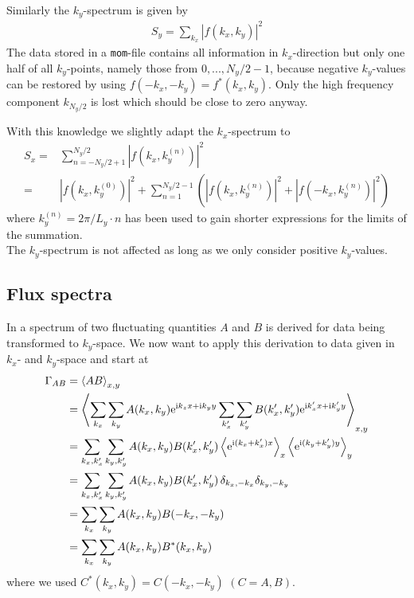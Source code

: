 \documentclass[12pt, a4paper, fleqn]{article}
\begin{document}
Similarly the $k_y$-spectrum is given by
\begin{align}
S_y = \sum_{k_x} |f(k_x,k_y)|^2
\end{align}
The data stored in a \texttt{mom}-file contains all information in $k_x$-direction but only
one half of all $k_y$-points, namely those from $0, ..., N_y/2-1$, because negative $k_y$-values can be restored by using
$f(-k_x,-k_y) = f^*(k_x,k_y)$. Only the high frequency component $k_{N_y/2}$ is lost
which should be close to zero anyway.
\par
With this knowledge we slightly adapt the $k_x$-spectrum to 
\begin{align}
S_x = & \sum_{n=-N_y/2+1}^{N_y/2} |f(k_x,k^{(n)}_y)|^2 \nonumber \\
 = & |f(k_x, k^{(0)}_y)|^2 + \sum_{n =
 1}^{N_y/2-1}\left(|f(k_x,k^{(n)}_y)|^2+|f(-k_x,k^{(n)}_y)|^2\right)
\end{align}
where $k^{(n)}_y = 2\pi/L_y \cdot n$ has been used to gain shorter expressions for the limits of
the summation.\\
The $k_y$-spectrum is not affected as long as we only consider positive $k_y$-values.


\subsection{Flux spectra}

In \cite{Jenko99} a spectrum of two fluctuating quantities $A$ and $B$ is derived for data
being transformed to $k_y$-space. We now want to apply this derivation to data given in
$k_x$- and $k_y$-space and start at 
\begin{align}
\Gamma_{AB} & = \left\langle A B \right\rangle_{x,y} \nonumber \\
 & = \left\langle \sum_{k_x}\sum_{k_y} A(k_x, k_y) {\rm e}^{{\rm i}k_z
x+{\rm i} k_y y} \sum_{k'_x}\sum_{k'_y} B(k'_x, k'_y) {\rm e}^{{\rm i}k'_x
x+{\rm i} k'_y y} \right\rangle_{x,y} \nonumber \\
 & = \sum_{k_x,k'_x}\sum_{k_y,k'_y} A(k_x, k_y) B(k'_x, k'_y) \left\langle {\rm
e}^{{\rm i}(k_x + k'_x) x} \right\rangle_x \left\langle {\rm e}^{{\rm i}(k_y + k'_y) y}
\right\rangle_y \nonumber \\
 & = \sum_{k_x,k'_x} \sum_{k_y,k'_y} A(k_x, k_y) B(k'_x, k'_y)\, \delta_{k_x,-k_{x}}
\delta_{k_y,-k_{y}} \nonumber \\
 & = \sum_{k_x} \sum_{k_y} A(k_x, k_y) B(-k_{x}, -k_{y}) \nonumber \\
 & = \sum_{k_x} \sum_{k_y} A(k_x, k_y) B^*(k_{x}, k_{y}) \label{eq:Gamma_AB} 
\end{align}
where we used $C^*(k_x, k_y) = C(-k_x, -k_y)$ $(C=A,B)$.
\end{document}
